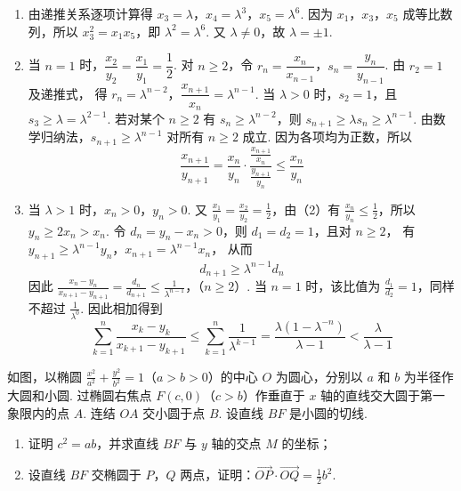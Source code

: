 \begin{solution}
\begin{enumerate}
\item 由递推关系逐项计算得 \(x_{3}=\lambda\)，\(x_{4}=\lambda^{3}\)，\(x_{5}=\lambda^{6}\). 因为 \(x_{1}\)，\(x_{3}\)，\(x_{5}\) 成等比数列，所以 \(x_{3}^{2}=x_{1}x_{5}\)，即 \(\lambda^{2}=\lambda^{6}\).
又 \(\lambda\neq0\)，故 \(\lambda=\pm1\).
\item 当 \(n=1\) 时，\(\dfrac{x_{2}}{y_{2}}=\dfrac{x_{1}}{y_{1}}=\dfrac12\). 对 \(n\geqslant2\)，令 \(r_{n}=\dfrac{x_{n}}{x_{n-1}}\)，\(s_{n}=\dfrac{y_{n}}{y_{n-1}}\). 由 \(r_{2}=1\) 及递推式，
得 \(r_{n}=\lambda^{n-2}\)，\(\dfrac{x_{n+1}}{x_{n}}=\lambda^{n-1}\).
当 \(\lambda>0\) 时，\(s_{2}=1\)，且 \(s_{3}\geqslant\lambda=\lambda^{2-1}\). 若对某个 \(n\geqslant2\) 有 \(s_{n}\geqslant\lambda^{n-2}\)，则 \(s_{n+1}\geqslant\lambda s_{n}\geqslant\lambda^{n-1}\). 由数学归纳法，\(s_{n+1}\geqslant\lambda^{n-1}\) 对所有 \(n\geqslant2\) 成立. 因为各项均为正数，所以
\[
\frac{x_{n+1}}{y_{n+1}}=\frac{x_{n}}{y_{n}}\cdot\frac{\frac{x_{n+1}}{x_{n}}}{\frac{y_{n+1}}{y_{n}}}\leqslant\frac{x_{n}}{y_{n}}
\]
\item 当 \(\lambda>1\) 时，\(x_n>0\)，\(y_n>0\). 又 \(\frac{x_{1}}{y_{1}}=\frac{x_{2}}{y_{2}}=\frac{1}{2}\)，由（2）有 \(\frac{x_{n}}{y_{n}}\leqslant\frac{1}{2}\)，所以 \(y_{n}\geqslant2x_{n}>x_{n}\). 令 \(d_{n}=y_{n}-x_{n}>0\)，则 \(d_{1}=d_{2}=1\)，且对 \(n\geqslant2\)，
有 \(y_{n+1}\geqslant\lambda^{n-1}y_{n}\)，\(x_{n+1}=\lambda^{n-1}x_{n}\)，
从而
\[
d_{n+1}\geqslant\lambda^{n-1}d_{n}
\]
因此
\(\frac{x_{n}-y_{n}}{x_{n+1}-y_{n+1}}=\frac{d_{n}}{d_{n+1}}\leqslant\frac{1}{\lambda^{n-1}}\)，（\(n\geqslant2\)）.
当 \(n=1\) 时，该比值为 \(\frac{d_{1}}{d_{2}}=1\)，同样不超过 \(\frac{1}{\lambda^{0}}\). 因此相加得到
\[
\sum_{k=1}^{n}\frac{x_{k}-y_{k}}{x_{k+1}-y_{k+1}}\leqslant\sum_{k=1}^{n}\frac{1}{\lambda^{k-1}}=\frac{\lambda(1-\lambda^{-n})}{\lambda-1}<\frac{\lambda}{\lambda-1}
\]
\end{enumerate}
\end{solution}

\begin{problem}
如图，以椭圆 \(\frac{x^2}{a^2}+\frac{y^2}{b^2}=1\)（\(a>b>0\)）的中心 \(O\) 为圆心，分别以 \(a\) 和 \(b\) 为半径作大圆和小圆. 过椭圆右焦点 \(F(c,0)\)（\(c>b\)）作垂直于 \(x\) 轴的直线交大圆于第一象限内的点 \(A\). 连结 \(OA\) 交小圆于点 \(B\). 设直线 \(BF\) 是小圆的切线.

\begin{enumerate}
\item 证明 \(c^2=ab\)，并求直线 \(BF\) 与 \(y\) 轴的交点 \(M\) 的坐标；
\item 设直线 \(BF\) 交椭圆于 \(P\)，\(Q\) 两点，证明：\(\overrightarrow{OP}\cdot\overrightarrow{OQ}=\frac{1}{2}b^2\).
\end{enumerate}

\end{problem}

